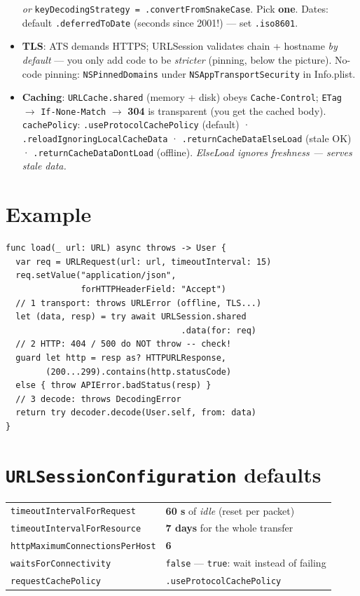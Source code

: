 \documentclass[8pt]{extarticle}
\begin{document}
\begin{multicols}{2}
\begin{itemize}
        \emph{or} \texttt{keyDecodingStrategy = .convertFromSnakeCase}. Pick \textbf{one}.
        Dates: default \texttt{.deferredToDate} (seconds since 2001!) — set \texttt{.iso8601}.
  \item \textbf{TLS}: ATS demands HTTPS; URLSession validates chain + hostname \emph{by default}
        — you only add code to be \emph{stricter} (pinning, below the picture). No-code
        pinning: \texttt{NSPinnedDomains} under \texttt{NSAppTransportSecurity} in Info.plist.
  \item \textbf{Caching}: \texttt{URLCache.shared} (memory + disk) obeys \texttt{Cache-Control};
        \texttt{ETag} $\to$ \texttt{If-None-Match} $\to$ \textbf{304} is transparent (you get the
        cached body). \texttt{cachePolicy}: \texttt{.useProtocolCachePolicy} (default) ·
        \texttt{.reloadIgnoringLocalCacheData} · \texttt{.returnCacheDataElseLoad} (stale OK) ·
        \texttt{.returnCacheDataDontLoad} (offline). \emph{ElseLoad ignores freshness — serves stale data.}
\end{itemize}

\section{Example}
\begin{lstlisting}[language=SwiftSheet]
func load(_ url: URL) async throws -> User {
  var req = URLRequest(url: url, timeoutInterval: 15)
  req.setValue("application/json",
               forHTTPHeaderField: "Accept")
  // 1 transport: throws URLError (offline, TLS...)
  let (data, resp) = try await URLSession.shared
                                   .data(for: req)
  // 2 HTTP: 404 / 500 do NOT throw -- check!
  guard let http = resp as? HTTPURLResponse,
        (200...299).contains(http.statusCode)
  else { throw APIError.badStatus(resp) }
  // 3 decode: throws DecodingError
  return try decoder.decode(User.self, from: data)
}
\end{lstlisting}

\section{\texttt{URLSessionConfiguration} defaults}
{\footnotesize
\begin{tabular}{@{}l l@{}}
\toprule
\texttt{timeoutIntervalForRequest} & \textbf{60 s} of \emph{idle} (reset per packet) \\
\texttt{timeoutIntervalForResource} & \textbf{7 days} for the whole transfer \\
\texttt{httpMaximumConnectionsPerHost} & \textbf{6} \\
\texttt{waitsForConnectivity} & \texttt{false} — \texttt{true}: wait instead of failing \\
\texttt{requestCachePolicy} & \texttt{.useProtocolCachePolicy} \\
\bottomrule
\end{tabular}}


\end{multicols}
\end{document}
